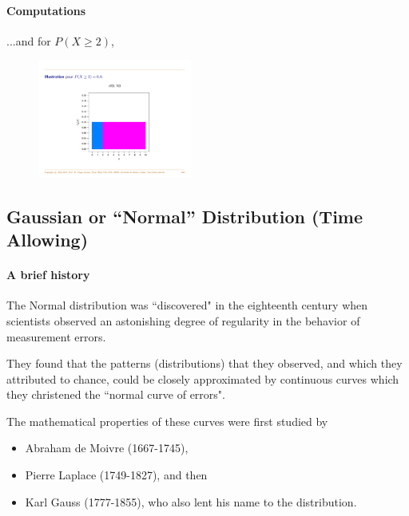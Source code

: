 \documentclass[notes=show,smaller]{beamer}\usepackage[]{graphicx}\usepackage[]{color}
\newenvironment{stepitemize}{\begin{itemize}[<+->]}{\end{itemize} }
\begin{document}
\begin{frame}{\subsecname}
  \framesubtitle{Computations}

  \begin{example}[continued]

  ...and for $P(X\geq 2)$,
  \begin{figure}[ptb]\centering
  \includegraphics[width=0.45\textwidth,height=0.55\textheight, angle= 0]{img/CDF_Diego.pdf}%
  \end{figure}
  \end{example}
\end{frame}

\subsection{Gaussian or ``Normal'' Distribution (Time Allowing)}

\begin{frame}{\subsecname}
\framesubtitle{A brief history}
  The Normal distribution was ``discovered" in the eighteenth
  century when scientists observed an astonishing degree of
  regularity in the behavior of measurement errors.

  \medskip

  They found that
  the patterns (distributions) that they observed, and which they
  attributed to chance, could be closely approximated by continuous
  curves which they christened the ``normal curve of errors".

  \medskip

  The mathematical properties of these curves were first studied by
  \begin{stepitemize}
  \item Abraham de Moivre (1667-1745),
  \item Pierre Laplace (1749-1827), and then
  \item Karl Gauss (1777-1855), who also lent his name to the
  distribution.
  \end{stepitemize}
\end{frame}
\end{document}
